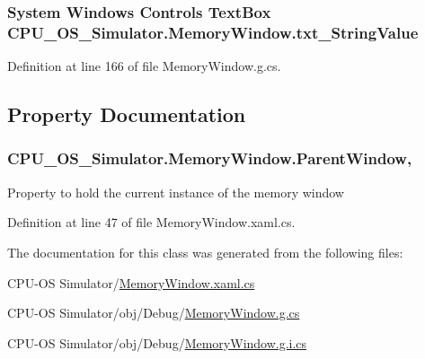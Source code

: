 \subsubsection[{txt\+\_\+\+String\+Value}]{\setlength{\rightskip}{0pt plus 5cm}System Windows Controls Text\+Box C\+P\+U\+\_\+\+O\+S\+\_\+\+Simulator.\+Memory\+Window.\+txt\+\_\+\+String\+Value\hspace{0.3cm}{\ttfamily [package]}}\label{class_c_p_u___o_s___simulator_1_1_memory_window_aca8e57432af036b698d0eeaaa765c483}


Definition at line 166 of file Memory\+Window.\+g.\+cs.



\subsection{Property Documentation}
\hypertarget{class_c_p_u___o_s___simulator_1_1_memory_window_ad61b6543a424be98fd0a4e0fa732f3d4}{}
\subsubsection[{Parent\+Window}]{ C\+P\+U\+\_\+\+O\+S\+\_\+\+Simulator.\+Memory\+Window.\+Parent\+Window\hspace{0.3cm}{\ttfamily [get]}, {\ttfamily [set]}}\label{class_c_p_u___o_s___simulator_1_1_memory_window_ad61b6543a424be98fd0a4e0fa732f3d4}


Property to hold the current instance of the memory window 



Definition at line 47 of file Memory\+Window.\+xaml.\+cs.



The documentation for this class was generated from the following files\+:\begin{DoxyCompactItemize}
\item 
C\+P\+U-\/\+O\+S Simulator/\hyperlink{_memory_window_8xaml_8cs}{Memory\+Window.\+xaml.\+cs}\item 
C\+P\+U-\/\+O\+S Simulator/obj/\+Debug/\hyperlink{_debug_2_memory_window_8g_8cs}{Memory\+Window.\+g.\+cs}\item 
C\+P\+U-\/\+O\+S Simulator/obj/\+Debug/\hyperlink{_debug_2_memory_window_8g_8i_8cs}{Memory\+Window.\+g.\+i.\+cs}\end{DoxyCompactItemize}
